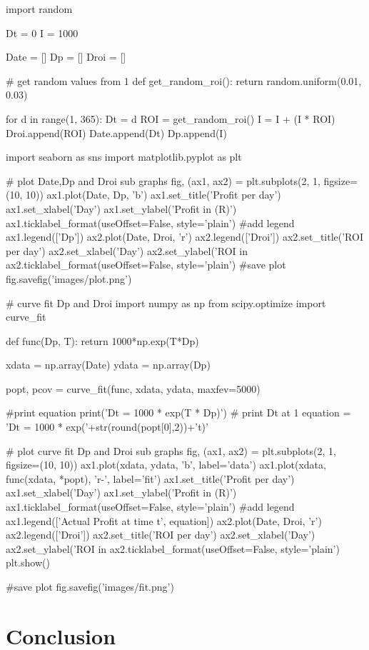 \begin{python}
import random

Dt = 0
I = 1000

Date = []
Dp = []
Droi = []

# get random values from 1%
def get_random_roi():
    return random.uniform(0.01, 0.03)

for d in range(1, 365):
    Dt = d
    ROI = get_random_roi()
    I = I + (I * ROI)
    Droi.append(ROI)
    Date.append(Dt)
    Dp.append(I)

import seaborn as sns
import matplotlib.pyplot as plt

# plot Date,Dp and Droi sub graphs
fig, (ax1, ax2) = plt.subplots(2, 1, figsize=(10, 10))
ax1.plot(Date, Dp, 'b')
ax1.set_title('Profit per day')
ax1.set_xlabel('Day')
ax1.set_ylabel('Profit in (R)')
ax1.ticklabel_format(useOffset=False, style='plain')
#add legend
ax1.legend(['Dp'])
ax2.plot(Date, Droi, 'r')
ax2.legend(['Droi'])
ax2.set_title('ROI per day')
ax2.set_xlabel('Day')
ax2.set_ylabel('ROI in %
ax2.ticklabel_format(useOffset=False, style='plain')
#save plot
fig.savefig('images/plot.png')



# curve fit Dp and Droi
import numpy as np
from scipy.optimize import curve_fit

def func(Dp, T):
    return 1000*np.exp(T*Dp)

xdata = np.array(Date)
ydata = np.array(Dp)

popt, pcov = curve_fit(func, xdata, ydata, maxfev=5000)

#print equation
print('Dt = 1000 * exp(T * Dp)')
# print Dt at 1
equation = 'Dt = 1000 * exp('+str(round(popt[0],2))+'t)'

# plot curve fit Dp and Droi sub graphs
fig, (ax1, ax2) = plt.subplots(2, 1, figsize=(10, 10))
ax1.plot(xdata, ydata, 'b', label='data')
ax1.plot(xdata, func(xdata, *popt), 'r-', label='fit')
ax1.set_title('Profit per day')
ax1.set_xlabel('Day')
ax1.set_ylabel('Profit in (R)')
ax1.ticklabel_format(useOffset=False, style='plain')
#add legend
ax1.legend(['Actual Profit at time t', equation])
ax2.plot(Date, Droi, 'r')
ax2.legend(['Droi'])
ax2.set_title('ROI per day')
ax2.set_xlabel('Day')
ax2.set_ylabel('ROI in %
ax2.ticklabel_format(useOffset=False, style='plain')
plt.show()

#save plot
fig.savefig('images/fit.png')
\end{python}

\section{Conclusion}

